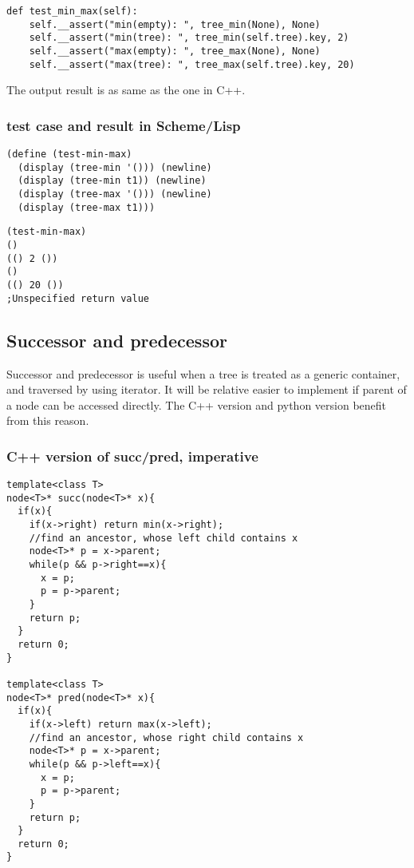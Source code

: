 \documentclass{article}
\begin{document}
\lstset{language=Python}
\begin{lstlisting}
def test_min_max(self):
    self.__assert("min(empty): ", tree_min(None), None)
    self.__assert("min(tree): ", tree_min(self.tree).key, 2)
    self.__assert("max(empty): ", tree_max(None), None)
    self.__assert("max(tree): ", tree_max(self.tree).key, 20)
\end{lstlisting}

The output result is as same as the one in C++.

\subsubsection*{test case and result in Scheme/Lisp}

\lstset{language=lisp}
\begin{lstlisting}
(define (test-min-max)
  (display (tree-min '())) (newline)
  (display (tree-min t1)) (newline)
  (display (tree-max '())) (newline)
  (display (tree-max t1)))
\end{lstlisting}

\begin{verbatim}
(test-min-max)
()
(() 2 ())
()
(() 20 ())
;Unspecified return value
\end{verbatim}

\subsection{Successor and predecessor}

Successor and predecessor is useful when a tree is treated as a generic container,
and traversed by using iterator. It will be relative easier to implement if parent of
a node can be accessed directly. The C++ version and python version benefit from
this reason.

\subsubsection*{C++ version of succ/pred, imperative}

\lstset{language=C++}
\begin{lstlisting}
template<class T>
node<T>* succ(node<T>* x){
  if(x){
    if(x->right) return min(x->right);
    //find an ancestor, whose left child contains x
    node<T>* p = x->parent;
    while(p && p->right==x){
      x = p;
      p = p->parent;
    }
    return p;
  }
  return 0;
}

template<class T>
node<T>* pred(node<T>* x){
  if(x){
    if(x->left) return max(x->left);
    //find an ancestor, whose right child contains x
    node<T>* p = x->parent;
    while(p && p->left==x){
      x = p;
      p = p->parent;
    }
    return p;
  }
  return 0;
}
\end{lstlisting}
\end{document}
